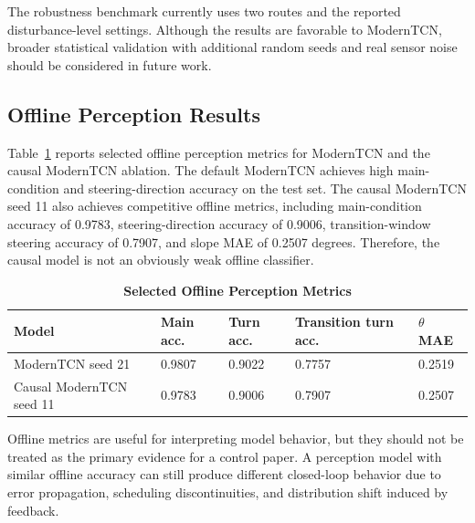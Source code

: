 \documentclass[twocolumn]{article}
\begin{document}
The robustness benchmark currently uses two routes and the reported disturbance-level settings. Although the results are favorable to ModernTCN, broader statistical validation with additional random seeds and real sensor noise should be considered in future work.

\subsection{Offline Perception Results}

Table~\ref{tab:offline_metrics} reports selected offline perception metrics for ModernTCN and the causal ModernTCN ablation. The default ModernTCN achieves high main-condition and steering-direction accuracy on the test set. The causal ModernTCN seed 11 also achieves competitive offline metrics, including main-condition accuracy of 0.9783, steering-direction accuracy of 0.9006, transition-window steering accuracy of 0.7907, and slope MAE of 0.2507 degrees. Therefore, the causal model is not an obviously weak offline classifier.

\begin{table}[!t]

\caption{\textbf{Selected Offline Perception Metrics}}

\label{tab:offline_metrics}

\setlength{\tabcolsep}{3pt}

\begin{tabular}{|p{90pt}|p{47pt}|p{47pt}|p{47pt}|p{47pt}|}

\hline

Model & Main acc. & Turn acc. & Transition turn acc. & $\theta$ MAE \\

\hline

ModernTCN seed 21 & 0.9807 & 0.9022 & 0.7757 & 0.2519 \\

Causal ModernTCN seed 11 & 0.9783 & 0.9006 & 0.7907 & 0.2507 \\

\hline

\end{tabular}

\end{table}


Offline metrics are useful for interpreting model behavior, but they should not be treated as the primary evidence for a control paper. A perception model with similar offline accuracy can still produce different closed-loop behavior due to error propagation, scheduling discontinuities, and distribution shift induced by feedback.
\end{document}
